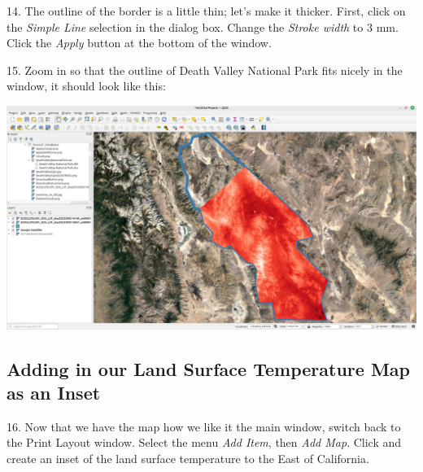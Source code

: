 \documentclass[oneside,a4paper,11pt,explicit]{book}
\begin{document}
14. The outline of the border is a little thin; let's make it thicker. First, click on the \textit{Simple Line} selection in the dialog box. Change the \textit{Stroke width} to 3 mm. Click the \textit{Apply} button at the bottom of the window.

15. Zoom in so that the outline of Death Valley National Park fits nicely in the window, it should look like this:

\vspace{.25em}

\centerline{\includegraphics[width=\textwidth]{DV_LST.png}}

\subsection{Adding in our Land Surface Temperature Map as an Inset}

16. Now that we have the map how we like it the main window, switch back to the Print Layout window. Select the menu \textit{Add Item}, then \textit{Add Map}. Click and create an inset of the land surface temperature to the East of California.
\end{document}

